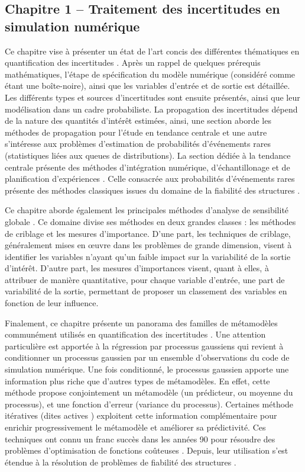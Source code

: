 \subsection*{Chapitre 1 -- Traitement des incertitudes en simulation numérique}
Ce chapitre vise à présenter un état de l'art concis des différentes thématiques en quantification des incertitudes \cite{sullivan_2015}. 
Après un rappel de quelques prérequis mathématiques, l'étape de spécification du modèle numérique (considéré comme étant une boîte-noire), ainsi que les variables d'entrée et de sortie est détaillée. 
Les différents types et sources d'incertitudes sont ensuite présentés, ainsi que leur modélisation dans un cadre probabiliste. 
La propagation des incertitudes dépend de la nature des quantités d'intérêt estimées, ainsi, une section aborde les méthodes de propagation pour l'étude en tendance centrale et une autre s'intéresse aux problèmes d'estimation de probabilités d'événements rares (statistiques liées aux queues de distributions). 
La section dédiée à la tendance centrale présente des méthodes d'intégration numérique, d'échantillonage et de planification d'expériences \cite{fang_liu_2018}. 
Celle consacrée aux probabilités d'événements rares présente des méthodes classiques issues du domaine de la fiabilité des structures \cite{ lemaire_2013,MorioBalesdent2015}.

Ce chapitre aborde également les principales méthodes d'analyse de sensibilité globale \cite{daveiga_iooss_2021}. 
Ce domaine divise ses méthodes en deux grandes classes : les méthodes de criblage et les mesures d'importance. 
D'une part, les techniques de criblage, généralement mises en \oe{}uvre dans les problèmes de grande dimension, visent à identifier les variables n'ayant qu'un faible impact sur la variabilité de la sortie d'intérêt. 
D'autre part, les mesures d'importances visent, quant à elles, à attribuer de manière quantitative, pour chaque variable d'entrée, une part de variabilité de la sortie, permettant de proposer un classement des variables en fonction de leur influence.

Finalement, ce chapitre présente un panorama des familles de métamodèles communément utilisés en quantification des incertitudes \cite{forrester_2008}. 
Une attention particulière est apportée à la régression par processus gaussiens qui revient à conditionner un processus gaussien par un ensemble d'observations du code de simulation numérique. 
Une fois conditionné, le processus gaussien apporte une information plus riche que d'autres types de métamodèles. 
En effet, cette méthode propose conjointement un métamodèle (un prédicteur, ou moyenne du processus), et une fonction d'erreur (variance du processus). 
Certaines méthode itératives (dites \og actives \fg{}) exploitent cette information complémentaire pour enrichir progressivement le métamodèle et améliorer sa prédictivité. 
Ces techniques ont connu un franc succès dans les années 90 pour résoudre des problèmes d'optimisation de fonctions coûteuses \cite{jones_1998}. 
Depuis, leur utilisation s'est étendue à la résolution de problèmes de fiabilité des structures \cite{echard_2011}.

